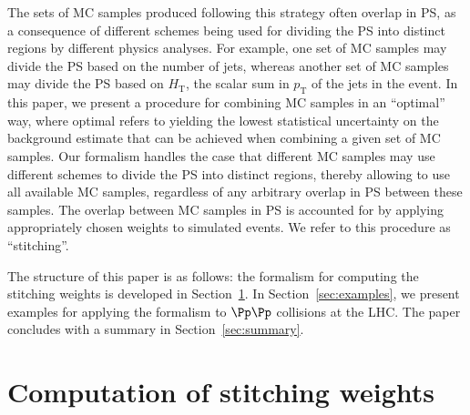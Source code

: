 \documentclass[twocolumn,epjc3]{svjour3}
\newcommand{\pT}{\ensuremath{p_{\textrm{T}}}\xspace}
\newcommand{\HT}{\ensuremath{H_{\mathrm{T}}}\xspace}
\begin{document}
The sets of MC samples produced following this strategy often overlap in PS,
as a consequence of different schemes being used for dividing the PS into distinct regions by different physics analyses.
For example, one set of MC samples may divide the PS based on the number of jets, 
whereas another set of MC samples may divide the PS based on $\HT$, the scalar sum in $\pT$ of the jets in the event.
In this paper, we present a procedure for combining MC samples in an ``optimal'' way,
where optimal refers to yielding the lowest statistical uncertainty on the background estimate that can be achieved when combining a given set of MC samples.
Our formalism handles the case that different MC samples may use different schemes to divide the PS into distinct regions,
thereby allowing to use all available MC samples, regardless of any arbitrary overlap in PS between these samples.
The overlap between MC samples in PS is accounted for by applying appropriately chosen weights to simulated events.
We refer to this procedure as ``stitching''.

The structure of this paper is as follows:
the formalism for computing the stitching weights is developed in Section~\ref{sec:stitching_weights}.
In Section~\ref{sec:examples}, we present examples for applying the formalism to $\Pp\Pp$ collisions at the LHC.
The paper concludes with a summary in Section~\ref{sec:summary}.


\section{Computation of stitching weights}
\label{sec:stitching_weights}
\end{document}
